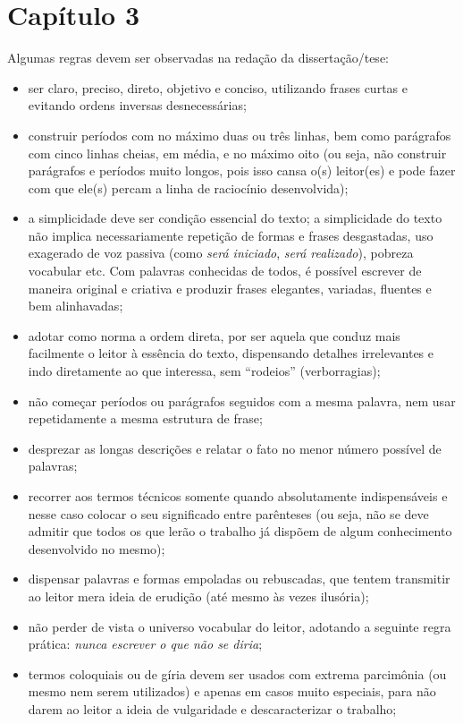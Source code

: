 \chapter{Capítulo 3}

Algumas regras devem ser observadas na redação da dissertação/tese: 

\begin{itemize}
   \item ser claro, preciso, direto, objetivo e conciso, utilizando frases curtas e evitando ordens inversas desnecessárias;
   \item construir períodos com no máximo duas ou três linhas, bem como parágrafos com cinco linhas cheias, em média, e no máximo oito (ou seja, não construir parágrafos e períodos muito longos, pois isso cansa o(s) leitor(es) e pode fazer com que ele(s) percam a linha de raciocínio desenvolvida);
   \item a simplicidade deve ser condição essencial do texto; a simplicidade do texto não implica necessariamente repetição de formas e frases desgastadas, uso exagerado de voz passiva (como \textit{será iniciado}, \textit{será realizado}), pobreza vocabular etc. Com palavras conhecidas de todos, é possível escrever de maneira original e criativa e produzir frases elegantes, variadas, fluentes e bem alinhavadas;
   \item adotar como norma a ordem direta, por ser aquela que conduz mais facilmente o leitor à essência do texto, dispensando detalhes irrelevantes e indo diretamente ao que interessa, sem ``rodeios'' (verborragias);
   \item não começar períodos ou parágrafos seguidos com a mesma palavra, nem usar repetidamente a mesma estrutura de frase;
   \item desprezar as longas descrições e relatar o fato no menor número possível de palavras;
   \item recorrer aos termos técnicos somente quando absolutamente indispensáveis e nesse caso colocar o seu significado entre parênteses (ou seja, não se deve admitir que todos os que lerão o trabalho já dispõem de algum conhecimento desenvolvido no mesmo);
   \item dispensar palavras e formas empoladas ou rebuscadas, que tentem transmitir ao leitor mera ideia de erudição (até mesmo às vezes ilusória);
   \item não perder de vista o universo vocabular do leitor, adotando a seguinte regra prática: \textit{nunca escrever o que não se diria};
   \item termos coloquiais ou de gíria devem ser usados com extrema parcimônia (ou mesmo nem serem utilizados) e apenas em casos muito especiais, para não darem ao leitor a ideia de vulgaridade e descaracterizar o trabalho;

\end{itemize}
